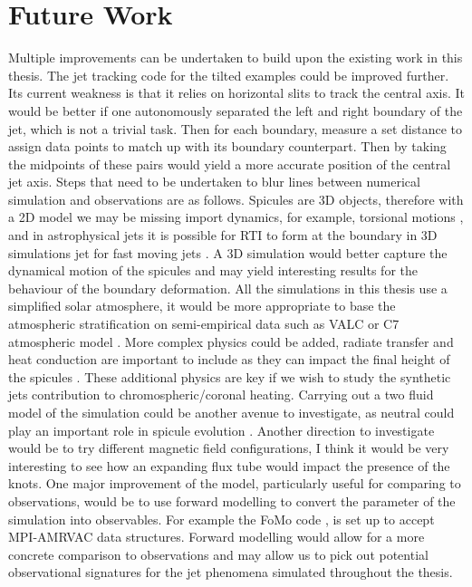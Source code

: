 \section{Future Work}
\label{sect:fut_work}
Multiple improvements can be undertaken to build upon the existing work in this thesis. The jet tracking code for the tilted examples could be improved further. Its current weakness is that it relies on horizontal slits to track the central axis. It would be better if one autonomously separated the left and right boundary of the jet, which is not a trivial task. Then for each boundary, measure a set distance to assign data points to match up with its boundary counterpart. Then by taking the midpoints of these pairs would yield a more accurate position of the central jet axis. Steps that need to be undertaken to blur lines between numerical simulation and observations are as follows. Spicules are 3D objects, therefore with a 2D model we may be missing import dynamics, for example, torsional motions \citep{dePontieu2012ApJ752L12D}, and in astrophysical jets it is possible for RTI to form at the boundary in 3D simulations jet for fast moving jets \citep{Matsumoto772L1M}. A 3D simulation would better capture the dynamical motion of the spicules and may yield interesting results for the behaviour of the boundary deformation. All the simulations in this thesis use a simplified solar atmosphere, it would be more appropriate to base the atmospheric stratification on semi-empirical data such as VALC or C7 atmospheric model \citep{Vernazza1981ApJS45635V,Avrett2008ApJS175229A}. More complex physics could be added, radiate transfer and heat conduction are important to include as they can impact the final height of the spicules \citep{Sterling1990ApJ349647S}. These additional physics are key if we wish to study the synthetic jets contribution to chromospheric/coronal heating. Carrying out a two fluid model of the simulation could be another avenue to investigate, as neutral could play an important role in spicule evolution \citep{kuzma2017ApJ84978K}. Another direction to investigate would be to try different magnetic field configurations, I think it would be very interesting to see how an expanding flux tube would impact the presence of the knots. One major improvement of the model, particularly useful for comparing to observations, would be to use forward modelling to convert the parameter of the simulation into observables. For example the FoMo code \citep{Doorsselaere2016FrASS34V}, is set up to accept MPI-AMRVAC data structures. Forward modelling would allow for a more concrete comparison to observations and may allow us to pick out potential observational signatures for the jet phenomena simulated throughout the thesis.